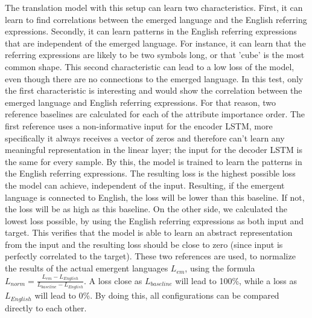 The translation model with this setup can learn two characteristics.
First, it can learn to find correlations between the emerged language and the English referring expressions.
Secondly, it can learn patterns in the English referring expressions that are independent of the emerged language.
For instance, it can learn that the referring expressions are likely to be two symbols long, or that 'cube' is the most common shape.
This second characteristic can lead to a low loss of the model, even though there are no connections to the emerged language.
In this test, only the first characteristic is interesting and would show the correlation between the emerged language and English referring expressions.
For that reason, two reference baselines are calculated for each of the attribute importance order.
The first reference uses a non-informative input for the encoder LSTM, more specifically it always receives a vector of zeros and therefore can't learn any meaningful representation in the linear layer; the input for the decoder LSTM is the same for every sample.
By this, the model is trained to learn the patterns in the English referring expressions.
The resulting loss is the highest possible loss the model can achieve, independent of the input.
Resulting, if the emergent language is connected to English, the loss will be lower than this baseline.
If not, the loss will be as high as this baseline.
On the other side, we calculated the lowest loss possible, by using the English referring expressions as both input and target.
This verifies that the model is able to learn an abstract representation from the input and the resulting loss should be close to zero (since input is perfectly correlated to the target).
These two references are used, to normalize the results of the actual emergent languages $L_{em}$, using the formula $L_{norm} = \frac{L_{em}-L_{English}}{L_{baseline} - L_{English}}$.
A loss close as $L_{baseline}$ will lead to 100\%, while a loss as $L_{English}$ will lead to 0\%.
By doing this, all configurations can be compared directly to each other.

